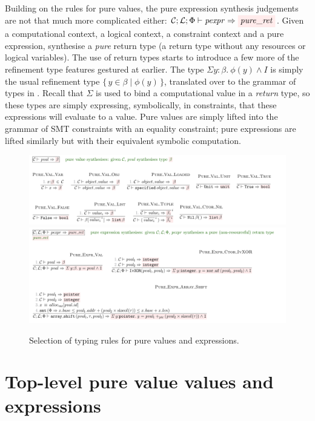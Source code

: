Building on the rules for pure values, the pure expression synthesis judgements
are not that much more complicated either: $\mathcal{C}; \mathcal{L}; \Phi
\vdash \mathit{pexpr} \Rightarrow \outpol{pure\_ret}$. Given a computational
context, a logical context, a constraint context and a pure expression,
synthesise a \emph{pure} return type (a return type without any resources or
logical variables). The use of return types starts to introduce a few more of
the refinement type features gestured at earlier. The type $\Sigma y {:}
\beta.\ \phi(y) \wedge{} I$ is simply the usual refinement type $\{ \, y \in
\beta \mid\phi(y) \, \}$, translated over to the grammar of types in . Recall that $\Sigma$ is used to bind a computational value in a
\emph{return} type, so these types are simply expressing, symbolically, in
constraints, that these expressions will evaluate to a value. Pure values are
simply lifted into the grammar of SMT constraints with an equality constraint;
pure expressions are lifted similarly but with their equivalent symbolic
computation.

\begin{figure}[tp]
    \includegraphics{figures/kernel-pval-typing}
    \includegraphics{figures/kernel-pexpr-typing}
    \caption{Selection of  typing rules for pure values and
        expressions.}\label{fig:typing-pval-pexpr}
\end{figure}

\section{Top-level pure value values and expressions}

